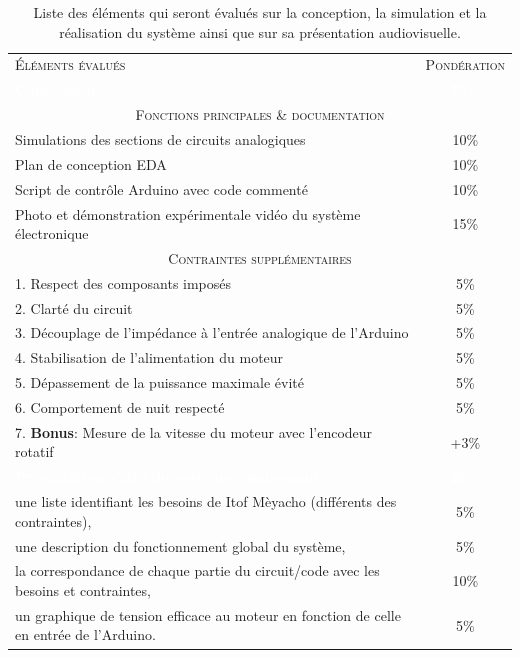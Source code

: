\documentclass[english,french,12pt]{article}
\begin{document}
\renewcommand{\arraystretch}{1.5}
\begin{table}[h!]
\centering
    \begin{tabular}{l c}
    \hline
     \textsc{Éléments évalués} & \textsc{Pondération}\\
     \rowcolor{black} \textcolor{white}{\textbf{Conception}} & \textcolor{white}{\textbf{75\%}}\\
     \multicolumn{2}{c}{\textsc{Fonctions principales \& documentation}}\\
     \hline
     Simulations des sections de circuits analogiques & 10\%\\
     Plan de conception EDA & 10\%\\
     Script de contrôle Arduino avec code commenté & 10\%\\
     Photo et démonstration expérimentale vidéo du système électronique & 15\%\\
     \hline
     \multicolumn{2}{c}{\textsc{Contraintes supplémentaires}}\\
     \hline
     1. Respect des composants imposés & 5\%\\
     2. Clarté du circuit & 5\%\\
     3. Découplage de l'impédance à l'entrée analogique de l'Arduino & 5\%\\
     4. Stabilisation de l'alimentation du moteur & 5\%\\
     5. Dépassement de la puissance maximale évité & 5\%\\
     6. Comportement de nuit respecté & 5\%\\
     7. \textbf{Bonus}: Mesure de la vitesse du moteur avec l'encodeur rotatif & +3\%\\ 
     \rowcolor{black} \textcolor{white}{\textbf{Présentation vidéo du système comprenant:}} & \textcolor{white}{\textbf{25\%}}\\
     une liste identifiant les besoins de Itof Mèyacho (différents des contraintes), & 5\%\\
     une description du fonctionnement global du système, & 5\%\\
     la correspondance de chaque partie du circuit/code avec les besoins et contraintes, & 10\%\\
     \small un graphique de tension efficace au moteur en fonction de celle en entrée de l'Arduino. & 5\%\\
     \hline
    \end{tabular}
\caption{Liste des éléments qui seront évalués sur la conception, la simulation et la réalisation du système ainsi que sur sa présentation audiovisuelle.}
\label{tab:1}
\end{table}
\end{document}
